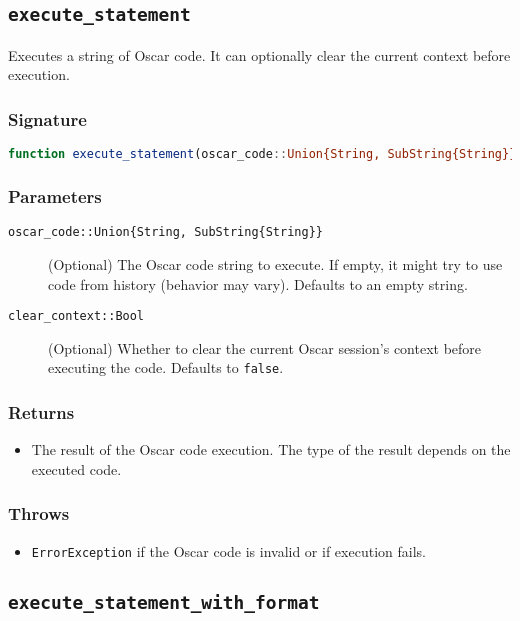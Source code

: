 \documentclass[11pt,a4paper]{article}
\newcommand{\code}[1]{\texttt{#1}}
\newcommand{\func}[1]{\texttt{#1}}
\providecommand{\code}[1]{\texttt{\color{blue!70!black}#1}}
\begin{document}
\subsection{\func{execute\_statement}}
\label{func:execute_statement}

Executes a string of Oscar code. It can optionally clear the current context before execution.

\subsubsection*{Signature}
\begin{lstlisting}[language=Julia]
function execute_statement(oscar_code::Union{String, SubString{String}}=""; clear_context=false)
\end{lstlisting}

\subsubsection*{Parameters}
\begin{description}
    \item[\code{oscar\_code::Union\{String, SubString\{String\}\}}] (Optional) The Oscar code string to execute. If empty, it might try to use code from history (behavior may vary). Defaults to an empty string.
    \item[\code{clear\_context::Bool}] (Optional) Whether to clear the current Oscar session's context before executing the code. Defaults to \code{false}.
\end{description}

\subsubsection*{Returns}
\begin{itemize}
    \item The result of the Oscar code execution. The type of the result depends on the executed code.
\end{itemize}

\subsubsection*{Throws}
\begin{itemize}
    \item \code{ErrorException} if the Oscar code is invalid or if execution fails.
\end{itemize}


\subsection{\func{execute\_statement\_with\_format}}
\label{func:execute_statement_with_format}
\end{document}
